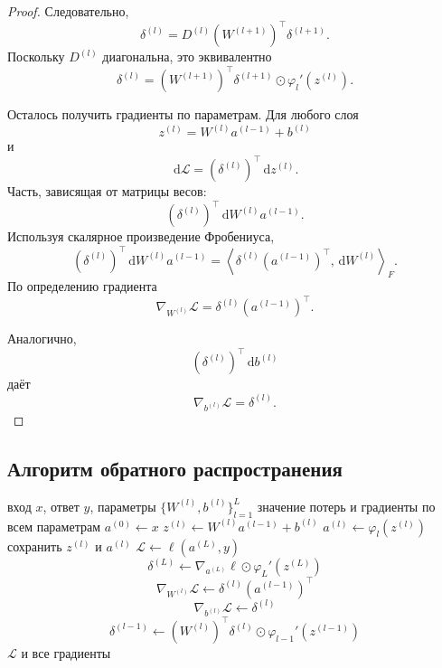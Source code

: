\documentclass[12pt,a4paper]{article}
\theoremstyle{plain}
\theoremstyle{definition}
\theoremstyle{remark}
\newcommand{\inner}[2]{\left\langle #1,#2 \right\rangle}
\newcommand{\dd}{\,\mathrm{d}}
\begin{document}
\begin{proof}
Следовательно,
\[
    \delta^{(l)}
    =
    D^{(l)}
    \left(
        W^{(l+1)}
    \right)^\top
    \delta^{(l+1)}.
\]
Поскольку $D^{(l)}$ диагональна, это эквивалентно
\[
    \delta^{(l)}
    =
    \left(
        W^{(l+1)}
    \right)^\top
    \delta^{(l+1)}
    \odot
    \varphi_l'(z^{(l)}).
\]

Осталось получить градиенты по параметрам. Для любого слоя
\[
    z^{(l)}
    =
    W^{(l)}a^{(l-1)}+b^{(l)}
\]
и
\[
    \dd\mathcal{L}
    =
    \left(
        \delta^{(l)}
    \right)^\top
    \dd z^{(l)}.
\]
Часть, зависящая от матрицы весов:
\[
    \left(
        \delta^{(l)}
    \right)^\top
    \dd W^{(l)}a^{(l-1)}.
\]
Используя скалярное произведение Фробениуса,
\[
    \left(
        \delta^{(l)}
    \right)^\top
    \dd W^{(l)}a^{(l-1)}
    =
    \inner{
        \delta^{(l)}
        (a^{(l-1)})^\top
    }{
        \dd W^{(l)}
    }_F.
\]
По определению градиента
\[
    \nabla_{W^{(l)}}\mathcal{L}
    =
    \delta^{(l)}
    (a^{(l-1)})^\top.
\]

Аналогично,
\[
    \left(
        \delta^{(l)}
    \right)^\top
    \dd b^{(l)}
\]
даёт
\[
    \nabla_{b^{(l)}}\mathcal{L}
    =
    \delta^{(l)}.
\]
\end{proof}

\subsection{Алгоритм обратного распространения}

\begin{algorithm}[H]
\caption{Обратное распространение для одного объекта}
\begin{algorithmic}[1]
\Require вход $x$, ответ $y$, параметры
$\{W^{(l)},b^{(l)}\}_{l=1}^{L}$
\Ensure значение потерь и градиенты по всем параметрам
\State $a^{(0)}\gets x$
    \State
    $z^{(l)}
    \gets
    W^{(l)}a^{(l-1)}+b^{(l)}$
    \State
    $a^{(l)}
    \gets
    \varphi_l(z^{(l)})$
    \State сохранить $z^{(l)}$ и $a^{(l)}$
\EndFor
\State
$\mathcal{L}\gets\ell(a^{(L)},y)$
\State
\[
    \delta^{(L)}
    \gets
    \nabla_{a^{(L)}}\ell
    \odot
    \varphi_L'(z^{(L)})
\]
    \State
    \[
        \nabla_{W^{(l)}}\mathcal{L}
        \gets
        \delta^{(l)}
        (a^{(l-1)})^\top
    \]
    \State
    \[
        \nabla_{b^{(l)}}\mathcal{L}
        \gets
        \delta^{(l)}
    \]
        \State
        \[
            \delta^{(l-1)}
            \gets
            (W^{(l)})^\top\delta^{(l)}
            \odot
            \varphi_{l-1}'(z^{(l-1)})
        \]
    \EndIf
\EndFor
\State \Return $\mathcal{L}$ и все градиенты
\end{algorithmic}
\end{algorithm}
\end{document}
